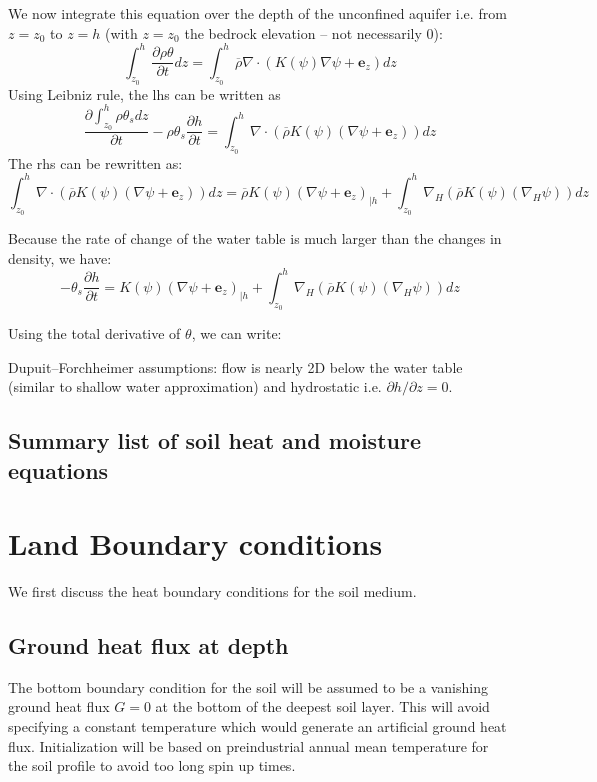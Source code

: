 \documentclass{article}
\begin{document}
We now integrate this equation over the depth of the unconfined aquifer i.e. from $z=z_0$ to $z=h$ (with $z=z_0$ the bedrock elevation – not necessarily 0):
\begin{equation}
\int_{z_0}^h \frac{\partial \rho \theta}{\partial t} dz = \int_{z_0}^h {\overline \rho} \nabla \cdot \left( K(\psi) \nabla \psi + {\mathbf e_z} \right) dz
\end{equation}
Using Leibniz rule, the lhs can be written as 
\begin{equation}
\frac{\partial \int_{z_0}^h \rho \theta_s dz }{\partial t} - \rho \theta_s \frac{\partial h}{\partial t}= \int_{z_0}^h \nabla \cdot \left( {\overline \rho} K(\psi) \left(\nabla \psi + {\mathbf e_z} \right) \right) dz
\end{equation}
The rhs can be rewritten as:
\begin{equation}
\int_{z_0}^h  \nabla \cdot \left( {\overline \rho} K(\psi) \left(\nabla \psi + {\mathbf e_z} \right) \right) dz = {\overline \rho} K(\psi) \left(\nabla \psi + {\mathbf e_z} \right)_{|h}  + \int_{z_0}^h  \nabla_H \left( {\overline \rho} K(\psi) \left(\nabla_H \psi \right) \right) dz
\end{equation}

Because the rate of change of the water table is much larger than the changes in density, we have: 
\begin{equation}
-	\theta_s \frac{\partial h}{\partial t} = 
 K(\psi) \left(\nabla \psi + {\mathbf e_z} \right)_{|h}  + \int_{z_0}^h  \nabla_H \left( {\overline \rho} K(\psi) \left(\nabla_H \psi \right) \right) dz
\end{equation}

Using the total derivative of $\theta$, we can write:


Dupuit–Forchheimer assumptions: flow is nearly 2D below the water table (similar to shallow water approximation) and hydrostatic i.e. $\partial h/\partial z=0$.

\subsection{Summary list of soil heat and moisture equations}

\section{Land Boundary conditions}
We first discuss the heat boundary conditions for the soil medium.
\subsection{Ground heat flux at depth}
The bottom boundary condition for the soil will be assumed to be a vanishing ground heat flux $G=0$ at the bottom of the deepest soil layer. This will avoid specifying a constant temperature which would generate an artificial ground heat flux. Initialization will be based on preindustrial annual mean temperature for the soil profile to avoid too long spin up times.
\end{document}
